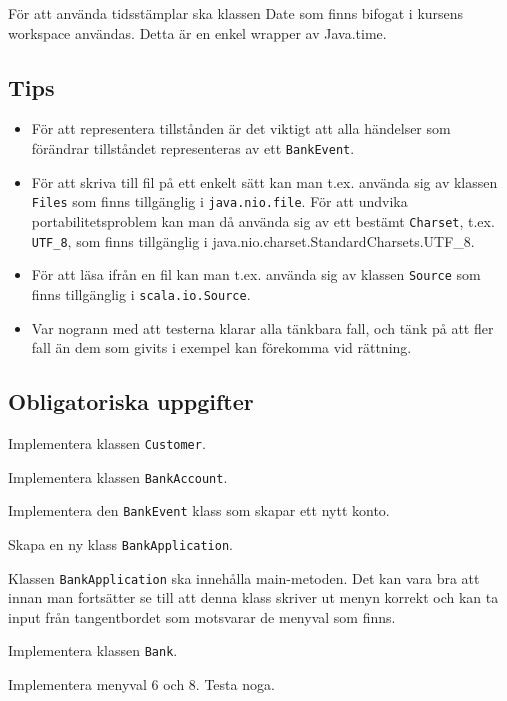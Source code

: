 För att använda tidsstämplar ska klassen Date som finns bifogat i kursens workspace användas. Detta är en enkel wrapper av Java.time.


\subsection{Tips} 

\begin{itemize}
\item För att representera tillstånden är det viktigt att alla händelser som förändrar tillståndet representeras av ett \texttt{BankEvent}.

\item För att skriva till fil på ett enkelt sätt kan man t.ex. använda sig av klassen \texttt{Files} som finns tillgänglig i \texttt{java.nio.file}. För att undvika portabilitetsproblem kan man då använda sig av ett bestämt \texttt{Charset}, t.ex. \texttt{UTF\_8}, som finns tillgänglig i {java.nio.charset.StandardCharsets.UTF\_8}.

\item För att läsa ifrån en fil kan man t.ex. använda sig av klassen \texttt{Source} som finns tillgänglig i \texttt{scala.io.Source}. 

\item Var nogrann med att testerna klarar alla tänkbara fall, och tänk på att fler fall än dem som givits i exempel kan förekomma vid rättning.
\end{itemize}

\subsection{Obligatoriska uppgifter}

\Task Implementera klassen \texttt{Customer}.

\Task Implementera klassen \texttt{BankAccount}.

\Task Implementera den \texttt{BankEvent} klass som skapar ett nytt konto.

\Task Skapa en ny klass \texttt{BankApplication}.

\Subtask Klassen \texttt{BankApplication} ska innehålla main-metoden. Det kan vara bra att innan man fortsätter se till att denna klass skriver ut menyn korrekt och kan ta input från tangentbordet som motsvarar de menyval som finns.

\Task Implementera klassen \texttt{Bank}.

\Subtask Implementera menyval 6 och 8. Testa noga.

